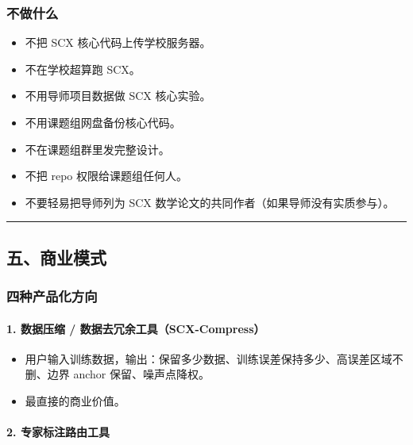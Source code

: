 \documentclass[
  12pt,
]{ctexart}
\providecommand{\tightlist}{%
  \setlength{\itemsep}{0pt}\setlength{\parskip}{0pt}}
\begin{document}
\subsubsection{不做什么}\label{ux4e0dux505aux4ec0ux4e48-1}

\begin{itemize}
\tightlist
\item
  不把 SCX 核心代码上传学校服务器。
\item
  不在学校超算跑 SCX。
\item
  不用导师项目数据做 SCX 核心实验。
\item
  不用课题组网盘备份核心代码。
\item
  不在课题组群里发完整设计。
\item
  不把 repo 权限给课题组任何人。
\item
  不要轻易把导师列为 SCX 数学论文的共同作者（如果导师没有实质参与）。
\end{itemize}

\begin{center}\rule{0.5\linewidth}{0.5pt}\end{center}

\subsection{五、商业模式}\label{ux4e94ux5546ux4e1aux6a21ux5f0f}

\subsubsection{四种产品化方向}\label{ux56dbux79cdux4ea7ux54c1ux5316ux65b9ux5411}

\paragraph{1. 数据压缩 /
数据去冗余工具（SCX-Compress）}\label{ux6570ux636eux538bux7f29-ux6570ux636eux53bbux5197ux4f59ux5de5ux5177scx-compress}

\begin{itemize}
\tightlist
\item
  用户输入训练数据，输出：保留多少数据、训练误差保持多少、高误差区域不删、边界
  anchor 保留、噪声点降权。
\item
  最直接的商业价值。
\end{itemize}

\paragraph{2.
专家标注路由工具}\label{ux4e13ux5bb6ux6807ux6ce8ux8defux7531ux5de5ux5177}
\end{document}
